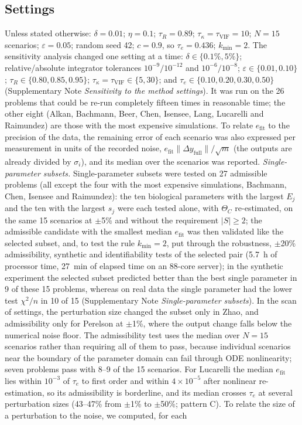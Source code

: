 \documentclass[pdflatex,sn-nature]{sn-jnl}
\theoremstyle{plain}
\begin{document}
\subsection*{Settings}\label{met:settings}

Unless stated otherwise: $\delta=0.01$; $\eta=0.1$; $\tau_R=0.89$; $\tau_\kappa=\tau_{\mathrm{VIF}}=10$; $N=15$ scenarios; $\varepsilon=0.05$; random seed 42; $c=0.9$, so $\tau_e=0.436$; $k_{\min}=2$. The sensitivity analysis changed one setting at a time: $\delta\in\{0.1\%,5\%\}$; relative/absolute integrator tolerances $10^{-9}/10^{-12}$ and $10^{-6}/10^{-8}$; $\varepsilon\in\{0.01,0.10\}$; $\tau_R\in\{0.80,0.85,0.95\}$; $\tau_\kappa=\tau_{\mathrm{VIF}}\in\{5,30\}$; and $\tau_e\in\{0.10,0.20,0.30,0.50\}$ (Supplementary Note \textit{Sensitivity to the method settings}). It was run on the 26 problems that could be re-run completely fifteen times in reasonable time; the other eight (Alkan, Bachmann, Beer, Chen, Isensee, Lang, Lucarelli and Raimundez) are those with the most expensive simulations. To relate $e_{\mathrm{fit}}$ to the precision of the data, the remaining error of each scenario was also expressed per measurement in units of the recorded noise, $e_{\mathrm{fit}}\|\Delta y_{\mathrm{full}}\|/\sqrt{m}$ (the outputs are already divided by $\sigma_i$), and its median over the scenarios was reported. \label{met:single}\emph{Single-parameter subsets.} Single-parameter subsets were tested on 27 admissible problems (all except the four with the most expensive simulations, Bachmann, Chen, Isensee and Raimundez): the ten biological parameters with the largest $E_j$ and the ten with the largest $s_j$ were each tested alone, with $\Theta_C$ re-estimated, on the same 15 scenarios at $\pm$5\% and without the requirement $|S|\ge2$; the admissible candidate with the smallest median $e_{\mathrm{fit}}$ was then validated like the selected subset, and, to test the rule $k_{\min}=2$, put through the robustness, $\pm$20\% admissibility, synthetic and identifiability tests of the selected pair (5.7~h of processor time, 27~min of elapsed time on an 88-core server); in the synthetic experiment the selected subset predicted better than the best single parameter in 9 of these 15 problems, whereas on real data the single parameter had the lower test $\chi^2/n$ in 10 of 15 (Supplementary Note \textit{Single-parameter subsets}). In the scan of settings, the perturbation size changed the subset only in Zhao, and admissibility only for Perelson at $\pm$1\%, where the output change falls below the numerical noise floor. The admissibility test uses the median over $N=15$ scenarios rather than requiring all of them to pass, because individual scenarios near the boundary of the parameter domain can fail through ODE nonlinearity; seven problems pass with 8--9 of the 15 scenarios. For Lucarelli the median $e_{\mathrm{fit}}$ lies within $10^{-3}$ of $\tau_e$ to first order and within $4\times10^{-5}$ after nonlinear re-estimation, so its admissibility is borderline, and its median crosses $\tau_e$ at several perturbation sizes (43--47\% from $\pm$1\% to $\pm$50\%; pattern C). To relate the size of a perturbation to the noise, we computed, for each 
\end{document}
